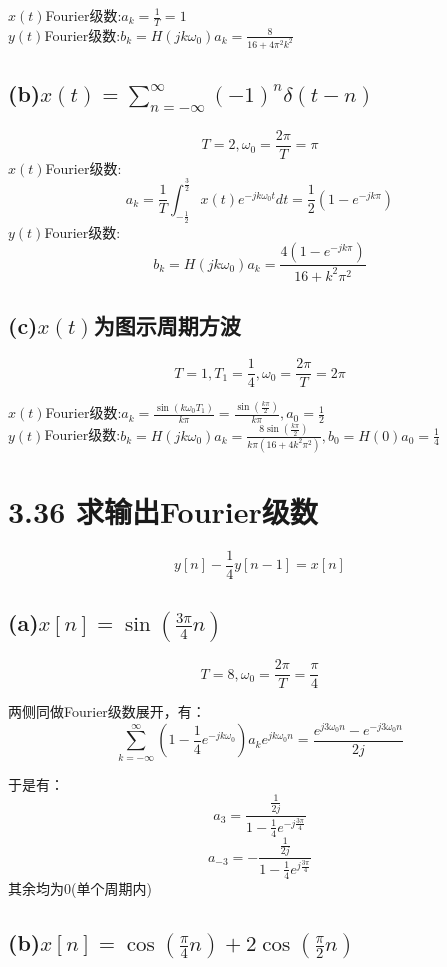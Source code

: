 \documentclass[UTF8,fontset=fandol,12pt,a4paper]{ctexart}
\begin{document}
\noindent $x(t)$Fourier级数:$a_k=\frac{1}{T}=1$\\
$y(t)$Fourier级数:$b_k=H(jk\omega_0)a_k=\frac{8}{16+4\pi^2k^2}$

\subsection*{(b)$x(t)=\sum_{n=-\infty}^{\infty}{(-1)}^n\delta(t-n)$}
$$T=2,\omega_0=\frac{2\pi}{T}=\pi$$
$x(t)$Fourier级数:
\[
a_k=\frac{1}{T}\int_{-\frac{1}{2}}^{\frac{3}{2}}x(t)e^{-jk\omega_0t}dt=\frac{1}{2}(1-e^{-jk\pi})
\]
$y(t)$Fourier级数:
\[
b_k=H(jk\omega_0)a_k=\frac{4(1-e^{-jk\pi})}{16+k^2\pi^2}
\]

\subsection*{(c)$x(t)$为图示周期方波}

$$T=1,T_1=\frac{1}{4},\omega_0=\frac{2\pi}{T}=2\pi$$

\noindent $x(t)$Fourier级数:$a_k=\frac{\sin{(k\omega_0T_1)}}{k\pi}=\frac{\sin{(\frac{k\pi}{2})}}{k\pi}, a_0=\frac{1}{2}$ \\
$y(t)$Fourier级数:$b_k=H(jk\omega_0)a_k=\frac{8\sin{(\frac{k\pi}{2})}}{k\pi(16+4k^2\pi^2)},b_0=H(0)a_0=\frac{1}{4}$

\section*{3.36 求输出Fourier级数}
$$y[n]-\frac{1}{4}y[n-1]=x[n]$$

\subsection*{(a)$x[n]=\sin{(\frac{3\pi}{4}n)}$}

$$T=8,\omega_0=\frac{2\pi}{T}=\frac{\pi}{4}$$

两侧同做Fourier级数展开，有：
\[
\sum_{k=-\infty}^{\infty}(1-\frac{1}{4}e^{-jk\omega_0})a_ke^{jk\omega_0n}=\frac{e^{j3\omega_0n}-e^{-j3\omega_0n}}{2j}
\]

于是有：
\[
a_3=\frac{\frac{1}{2j}}{1-\frac{1}{4}e^{-j\frac{3\pi}{4}}}
\]
\[
a_{-3}=-\frac{\frac{1}{2j}}{1-\frac{1}{4}e^{j\frac{3\pi}{4}}}
\]
\indent 其余均为0(单个周期内)

\subsection*{(b)$x[n]=\cos{(\frac{\pi}{4}n)}+2\cos{(\frac{\pi}{2}n)}$}
\end{document}
